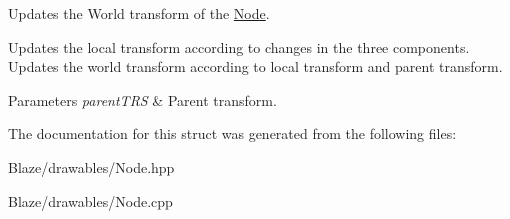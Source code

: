 Updates the World transform of the \hyperlink{structblaze_1_1Node}{Node}. 

Updates the local transform according to changes in the three components. Updates the world transform according to local transform and parent transform.


\begin{DoxyParams}{Parameters}
{\em parent\+T\+RS} & Parent transform. \\
\hline
\end{DoxyParams}


The documentation for this struct was generated from the following files\+:\begin{DoxyCompactItemize}
\item 
Blaze/drawables/Node.\+hpp\item 
Blaze/drawables/Node.\+cpp\end{DoxyCompactItemize}
